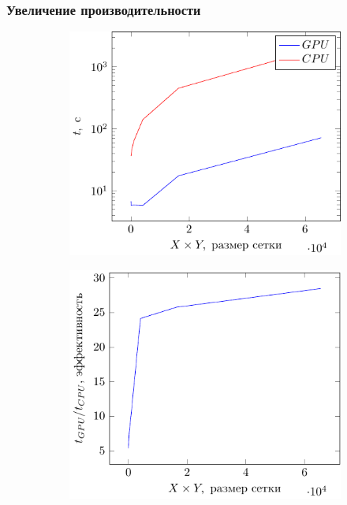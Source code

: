 \documentclass[10pt,pdf,hyperref={unicode}, dvipsnames]{beamer}
\begin{document}
\begin{frame}[t]
	\frametitle{Увеличение производительности}
    \begin{figure}[h]
        \begin{subfigure}{0.49\linewidth}
            \centering
            \includegraphics[width=\linewidth]{fig/water/gpucpu.pdf}
        \end{subfigure}
        \begin{subfigure}{0.49\linewidth}
            \centering
            \includegraphics[width=\linewidth]{fig/water/gpucpu1.pdf}
        \end{subfigure}
    \end{figure}
\end{frame}
\end{document}
